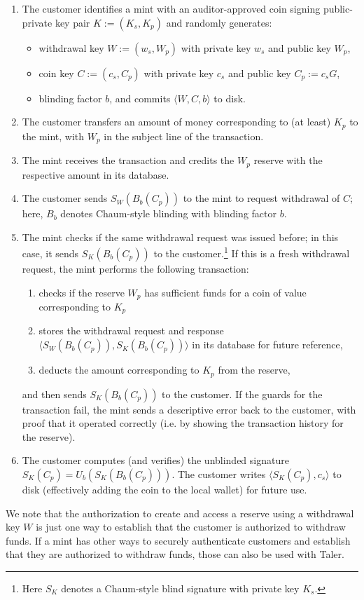 \documentclass{llncs}
\begin{document}
\begin{enumerate}
  \item The customer identifies a mint with an auditor-approved
        coin signing public-private key pair $K := (K_s, K_p)$
        and randomly generates:
        \begin{itemize}
           \item withdrawal key $W := (w_s,W_p)$ with private key $w_s$ and public key $W_p$,
           \item coin key $C := (c_s,C_p)$ with private key $c_s$ and public key $C_p := c_s G$,
           \item blinding factor $b$, and commits $\langle W, C, b \rangle$ to disk.
        \end{itemize}
  \item The customer transfers an amount of money corresponding to (at least) $K_p$ to the mint, with $W_p$ in the subject line of the transaction.
  \item The mint receives the transaction and credits the $W_p$ reserve with the respective amount in its database.
  \item The customer sends $S_W(B_b(C_p))$ to the mint to request withdrawal of $C$; here, $B_b$ denotes Chaum-style blinding with blinding factor $b$.
  \item The mint checks if the same withdrawal request was issued before; in this case, it sends $S_{K}(B_b(C_p))$ to the customer.\footnote{Here $S_K$
        denotes a Chaum-style blind signature with private key $K_s$.}
        If this is a fresh withdrawal request, the mint performs the following transaction:
        \begin{enumerate}
           \item checks if the reserve $W_p$ has sufficient funds for a coin of value corresponding to $K_p$
           \item stores the withdrawal request and response $\langle S_W(B_b(C_p)), S_K(B_b(C_p)) \rangle$ in its database for future reference,
           \item deducts the amount corresponding to $K_p$ from the reserve,
        \end{enumerate}
        and then sends $S_{K}(B_b(C_p))$ to the customer.
        If the guards for the transaction fail, the mint sends a descriptive error back to the customer,
        with proof that it operated correctly (i.e. by showing the transaction history for the reserve).
  \item The customer computes (and verifies) the unblinded signature $S_K(C_p) = U_b(S_K(B_b(C_p)))$.
        The customer writes $\langle S_K(C_p), c_s \rangle$ to disk (effectively adding the coin to the
        local wallet) for future use.
\end{enumerate}
We note that the authorization to create and access a reserve using a
withdrawal key $W$ is just one way to establish that the customer is
authorized to withdraw funds.  If a mint has other ways to securely
authenticate customers and establish that they are authorized to
withdraw funds, those can also be used with Taler.
\end{document}
